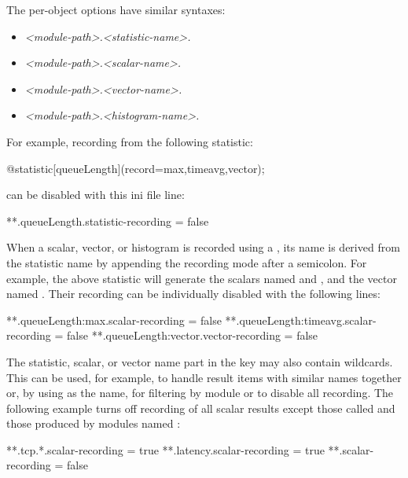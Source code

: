 The per-object options have similar syntaxes:

\begin{itemize}
  \item \textit{<module-path>.<statistic-name>.}
  \item \textit{<module-path>.<scalar-name>.}
  \item \textit{<module-path>.<vector-name>.}
  \item \textit{<module-path>.<histogram-name>.}
\end{itemize}

For example, recording from the following statistic:

\begin{ned}
@statistic[queueLength](record=max,timeavg,vector);
\end{ned}

can be disabled with this ini file line:

\begin{inifile}
**.queueLength.statistic-recording = false
\end{inifile}

When a scalar, vector, or histogram is recorded using a , its
name is derived from the statistic name by appending the recording mode after a
semicolon. For example, the above statistic will generate the scalars named
 and , and the vector named
. Their recording can be individually disabled with the
following lines:

\begin{inifile}
**.queueLength:max.scalar-recording = false
**.queueLength:timeavg.scalar-recording = false
**.queueLength:vector.vector-recording = false
\end{inifile}

The statistic, scalar, or vector name part in the key may also contain
wildcards. This can be used, for example, to handle result items with similar
names together or, by using \ttt{*} as the name, for filtering by module or to
disable all recording. The following example turns off recording of all scalar
results except those called  and those produced by modules named
:

\begin{inifile}
**.tcp.*.scalar-recording = true
**.latency.scalar-recording = true
**.scalar-recording = false
\end{inifile}


